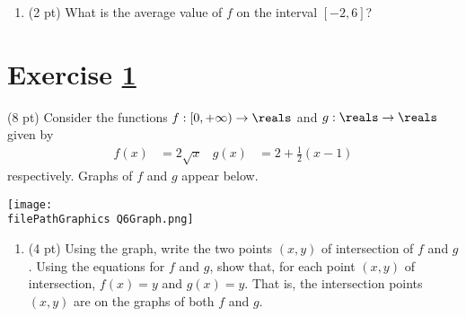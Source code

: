 \newpage%

\begin{enumerate}[resume,label=(\alph*)]
\item\label{itm : E3Q5c} (2 pt) What is the average value of $f$ on the interval $[-2,6]$?
\end{enumerate}






%
%
%
%


\newpage

\section{Exercise \ref{sec : Math112 Spring2022 Exam3 Q6}}
\label{sec : Math112 Spring2022 Exam3 Q6}

(8 pt) Consider the functions $f : [0,+\infty) \rightarrow \reals$ and $g : \reals \rightarrow \reals$ given by
\begin{align*}
f(x)
&=
2 \sqrt{x}
&
g(x)
&=
2 + \frac{1}{2} (x - 1)
\end{align*}
respectively. Graphs of $f$ and $g$ appear below.
\begin{center}
\texttt{[image: \\filePathGraphics Q6Graph.png]}
\end{center}



\begin{enumerate}[label=(\alph*)]
\item\label{itm : E3Q6a} (4 pt) Using the graph, write the two points $(x,y)$ of intersection of $f$ and $g$. Using the equations for $f$ and $g$, show that, for each point $(x,y)$ of intersection, $f(x) = y$ and $g(x) = y$. That is, the intersection points $(x,y)$ are on the graphs of both $f$ and $g$.
\end{enumerate}

